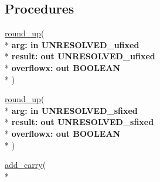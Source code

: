 \subsection*{Procedures}
 \begin{DoxyCompactItemize}
\item 
{\bfseries {\bfseries \textcolor{vhdlchar}{ }}} \hyperlink{class__fixed__pkg_ae2412cad395e63f171000f1085f2b78d}{round\+\_\+up}( \\*
{\bfseries \textcolor{vhdlchar}{ }\textcolor{vhdlchar}{arg\+: }\textcolor{stringliteral}{} {\bfseries \textcolor{keywordflow}{in}\textcolor{vhdlchar}{ }\textcolor{vhdlchar}{U\+N\+R\+E\+S\+O\+L\+V\+E\+D\+\_\+ufixed}\textcolor{vhdlchar}{ }}}\\*
  {\bfseries \textcolor{vhdlchar}{ }\textcolor{vhdlchar}{result\+: }\textcolor{stringliteral}{} {\bfseries \textcolor{keywordflow}{out}\textcolor{vhdlchar}{ }\textcolor{vhdlchar}{U\+N\+R\+E\+S\+O\+L\+V\+E\+D\+\_\+ufixed}\textcolor{vhdlchar}{ }}}\\*
  {\bfseries \textcolor{vhdlchar}{ }\textcolor{vhdlchar}{overflowx\+: }\textcolor{stringliteral}{} {\bfseries \textcolor{keywordflow}{out}\textcolor{vhdlchar}{ }\textcolor{comment}{B\+O\+O\+L\+E\+A\+N}\textcolor{vhdlchar}{ }}}\\*
   )
\item 
{\bfseries {\bfseries \textcolor{vhdlchar}{ }}} \hyperlink{class__fixed__pkg_ae2412cad395e63f171000f1085f2b78d}{round\+\_\+up}( \\*
{\bfseries \textcolor{vhdlchar}{ }\textcolor{vhdlchar}{arg\+: }\textcolor{stringliteral}{} {\bfseries \textcolor{keywordflow}{in}\textcolor{vhdlchar}{ }\textcolor{vhdlchar}{U\+N\+R\+E\+S\+O\+L\+V\+E\+D\+\_\+sfixed}\textcolor{vhdlchar}{ }}}\\*
  {\bfseries \textcolor{vhdlchar}{ }\textcolor{vhdlchar}{result\+: }\textcolor{stringliteral}{} {\bfseries \textcolor{keywordflow}{out}\textcolor{vhdlchar}{ }\textcolor{vhdlchar}{U\+N\+R\+E\+S\+O\+L\+V\+E\+D\+\_\+sfixed}\textcolor{vhdlchar}{ }}}\\*
  {\bfseries \textcolor{vhdlchar}{ }\textcolor{vhdlchar}{overflowx\+: }\textcolor{stringliteral}{} {\bfseries \textcolor{keywordflow}{out}\textcolor{vhdlchar}{ }\textcolor{comment}{B\+O\+O\+L\+E\+A\+N}\textcolor{vhdlchar}{ }}}\\*
   )
\item 
{\bfseries {\bfseries \textcolor{vhdlchar}{ }}} \hyperlink{class__fixed__pkg_abf0ec41fde696894c1f3a895e1156a1b}{add\+\_\+carry}( \\*

\end{DoxyCompactItemize}
